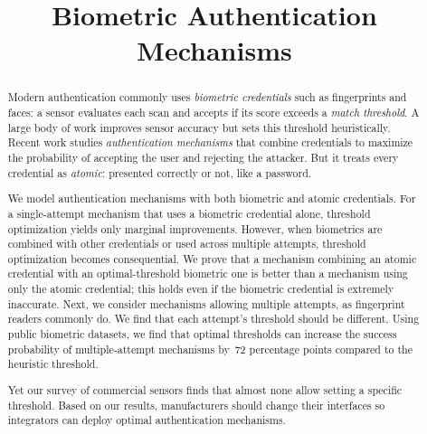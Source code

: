 \documentclass[conference,compsoc]{IEEEtran}
\begin{document}
\sloppy

\title{Biometric Authentication Mechanisms}

\maketitle

\begin{abstract}
Modern authentication commonly uses \emph{biometric credentials} such as fingerprints and faces: 
a sensor evaluates each scan and accepts if its score exceeds a \emph{match threshold}. 
A large body of work improves sensor accuracy but sets this threshold heuristically. 
Recent work studies \emph{authentication mechanisms} that combine credentials to maximize the probability of accepting the user and rejecting the attacker. 
But it treats every credential as \emph{atomic}: presented correctly or not, like a password. 

We model authentication mechanisms with both biometric and atomic credentials. 
For a single-attempt mechanism that uses a biometric credential alone, threshold optimization yields only marginal improvements. 
However, when biometrics are combined with other credentials or used across multiple attempts, threshold optimization becomes consequential.
We prove that a mechanism combining an atomic credential with an optimal-threshold biometric one is better than a mechanism using only the atomic credential; this holds even if the biometric credential is extremely inaccurate. 
Next, we consider mechanisms allowing multiple attempts, as fingerprint readers commonly do. 
We find that each attempt's threshold should be different. 
Using public biometric datasets, we find that optimal thresholds can increase the success probability of multiple-attempt mechanisms by~72 percentage points compared to the heuristic threshold. 

Yet our survey of commercial sensors finds that almost none allow setting a specific threshold. 
Based on our results, manufacturers should change their interfaces so integrators can deploy optimal authentication mechanisms.
\end{abstract}
\end{document}
